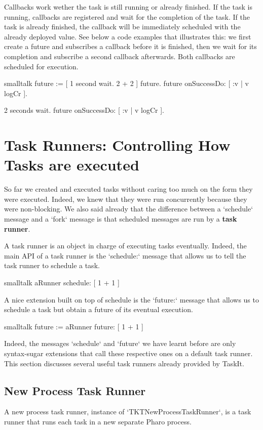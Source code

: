 \documentclass[10pt,twoside,english]{_support/latex/sbabook/sbabook}
\begin{document}
Callbacks work wether the task is still running or already finished. If the task is running, callbacks are registered and wait for the completion of the task. If the task is already finished, the callback will be immediately scheduled with the already deployed value. See below a code examples that illustrates this: we first create a future and subscribes a callback before it is finished, then we  wait for its completion and subscribe a second callback afterwards. Both callbacks are scheduled for execution.

\begin{displaycode}{smalltalk}
future := [ 1 second wait. 2 + 2 ] future.
future onSuccessDo: [ :v | v logCr ].

2 seconds wait.
future onSuccessDo: [ :v | v logCr ].
\end{displaycode}
\chapter{Task Runners: Controlling How Tasks are executed }
So far we created and executed tasks without caring too much on the form they were executed. Indeed, we knew that they were run concurrently because they were non-blocking. We also said already that the difference between a `schedule` message and a `fork` message is that scheduled messages are run by a \textbf{task runner}.

A task runner is an object in charge of executing tasks eventually. Indeed, the main API of a task runner is the `schedule:` message that allows us to tell the task runner to schedule a task.

\begin{displaycode}{smalltalk}
aRunner schedule: [ 1 + 1 ]
\end{displaycode}

A nice extension built on top of schedule is the  `future:` message that allows us to schedule a task but obtain a future of its eventual execution.

\begin{displaycode}{smalltalk}
future := aRunner future: [ 1 + 1 ]
\end{displaycode}

Indeed, the messages `schedule` and `future` we have learnt before are only syntax-sugar extensions that call these respective ones on a default task runner. This section discusses several useful task runners already provided by TaskIt.
\section{New Process Task Runner}
A new process task runner, instance of `TKTNewProcessTaskRunner`, is a task runner that runs each task in a new separate Pharo process. 
\end{document}

